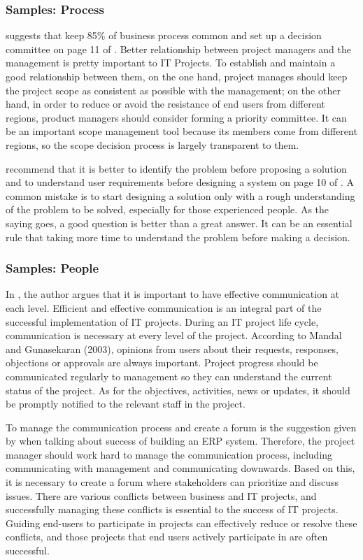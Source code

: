\subsubsection{Samples: Process}
\citeauthor{2} suggests that keep 85\% of business process common and set up a decision committee on page 11 of . Better relationship between project managers and the management is pretty important to IT Projects. To establish and maintain a good relationship between them, on the one hand, project manages should keep the project scope as consistent as possible with the management; on the other hand, in order to reduce or avoid the resistance of end users from different regions, product managers should consider forming a priority committee. It can be an important scope management tool because its members come from different regions, so the scope decision process is largely transparent to them.

\citeauthor{6} recommend that it is better to identify the problem before proposing a solution and to understand user requirements before designing a system on page 10 of . A common mistake is to start designing a solution only with a rough understanding of the problem to be solved, especially for those experienced people. As the saying goes, a good question is better than a great answer. It can be an essential rule that taking more time to understand the problem before making a decision.

\subsubsection{Samples: People}
In , the author argues that it is important to have effective communication at each level. Efficient and effective communication is an integral part of the successful implementation of IT projects. During an IT project life cycle, communication is necessary at every level of the project. According to Mandal and Gunasekaran (2003), opinions from users about their requests, responses, objections or approvals are always important. Project progress should be communicated regularly to management so they can understand the current status of the project. As for the objectives, activities, news or updates, it should be promptly notified to the relevant staff in the project.


To manage the communication process and create a forum is the suggestion given by \citeauthor{2} when talking about success of building an ERP system. Therefore, the project manager should work hard to manage the communication process, including communicating with management and communicating downwards. Based on this, it is necessary to create a forum where stakeholders can prioritize and discuss issues. There are various conflicts between business and IT projects, and successfully managing these conflicts is essential to the success of IT projects. Guiding end-users to participate in projects can effectively reduce or resolve these conflicts, and those projects that end users actively participate in are often successful.

